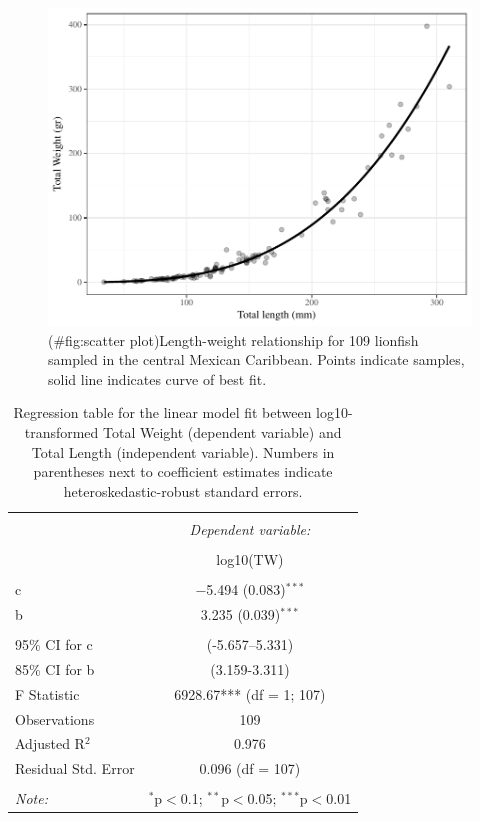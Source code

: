 \documentclass[fleqn,10pt,lineno]{wlpeerj} %
\theoremstyle{definition}
\theoremstyle{definition}
\theoremstyle{definition}
\theoremstyle{remark}
\begin{document}
\begin{figure}
\centering
\includegraphics{Manuscript_files/figure-latex/scatter plot-1.pdf}
\caption{(\#fig:scatter plot)Length-weight relationship for 109 lionfish
sampled in the central Mexican Caribbean. Points indicate samples, solid
line indicates curve of best fit.}
\end{figure}

\begin{table}[!htbp] \centering 
  \caption{Regression table for the linear model fit between log10-transformed Total Weight (dependent variable) and Total Length (independent variable). Numbers in parentheses next to coefficient estimates indicate heteroskedastic-robust standard errors.} 
  \label{} 
\begin{tabular}{@{\extracolsep{5pt}}lc} 
\\[-1.8ex]\hline 
\hline \\[-1.8ex] 
 & \multicolumn{1}{c}{\textit{Dependent variable:}} \\ 
\cline{2-2} 
\\[-1.8ex] & log10(TW) \\ 
\hline \\[-1.8ex] 
 c & $-$5.494 (0.083)$^{***}$ \\ 
  b & 3.235 (0.039)$^{***}$ \\ 
 \hline \\[-1.8ex] 
95\% CI for c & (-5.657--5.331) \\ 
85\% CI for b & (3.159-3.311) \\ 
F Statistic & 6928.67*** (df = 1; 107) \\ 
Observations & 109 \\ 
Adjusted R$^{2}$ & 0.976 \\ 
Residual Std. Error & 0.096 (df = 107) \\ 
\hline 
\hline \\[-1.8ex] 
\textit{Note:}  & \multicolumn{1}{r}{$^{*}$p$<$0.1; $^{**}$p$<$0.05; $^{***}$p$<$0.01} \\ 
\end{tabular} 
\end{table}
\end{document}
